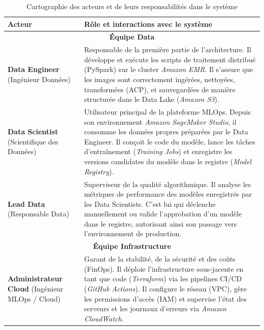 \begin{table}[H]
\centering
\caption{Cartographie des acteurs et de leurs responsabilités dans le système}
\label{tab:acteurs_systeme}
\renewcommand{\arraystretch}{1.4}
\begin{tabular}{|p{3.5cm}|p{11cm}|}
\hline
\rowcolor{darkgreen!20} \textbf{Acteur} & \textbf{Rôle et interactions avec le système} \\ \hline
\multicolumn{2}{|c|}{\cellcolor{gray!10}\textbf{Équipe Data}} \\ \hline
\textbf{Data Engineer} \newline (Ingénieur Données) & Responsable de la première partie de l'architecture. Il développe et exécute les scripts de traitement distribué (PySpark) sur le cluster \textit{Amazon EMR}. Il s'assure que les images sont correctement ingérées, nettoyées, transformées (ACP), et sauvegardées de manière structurée dans le Data Lake (\textit{Amazon S3}). \\ \hline
\textbf{Data Scientist} \newline (Scientifique des Données) & Utilisateur principal de la plateforme MLOps. Depuis son environnement \textit{Amazon SageMaker Studio}, il consomme les données propres préparées par le Data Engineer. Il conçoit le code du modèle, lance les tâches d'entraînement (\textit{Training Jobs}) et enregistre les versions candidates du modèle dans le registre (\textit{Model Registry}). \\ \hline
\textbf{Lead Data} \newline (Responsable Data) & Superviseur de la qualité algorithmique. Il analyse les métriques de performance des modèles enregistrés par les Data Scientists. C'est lui qui déclenche manuellement ou valide l'approbation d'un modèle dans le registre, autorisant ainsi son passage vers l'environnement de production. \\ \hline
\multicolumn{2}{|c|}{\cellcolor{gray!10}\textbf{Équipe Infrastructure}} \\ \hline
\textbf{Administrateur Cloud} \newline (Ingénieur MLOps / Cloud) & Garant de la stabilité, de la sécurité et des coûts (FinOps). Il déploie l'infrastructure sous-jacente en tant que code (\textit{Terraform}) via les pipelines CI/CD (\textit{GitHub Actions}). Il configure le réseau (VPC), gère les permissions d'accès (IAM) et supervise l'état des serveurs et les journaux d'erreurs via \textit{Amazon CloudWatch}. \\ \hline
\end{tabular}
\end{table}

